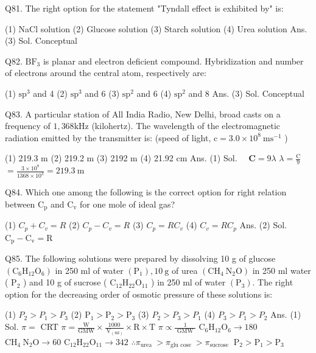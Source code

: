 \begin{enumerate}
Q81. The right option for the statement "Tyndall effect is exhibited by" is:

(1) NaCl solution
(2) Glucose solution
(3) Starch solution
(4) Urea solution
Ans. (3)
Sol. Conceptual

Q82. $\mathrm{BF}_{3}$ is planar and electron deficient compound. Hybridization and number of electrons around the central atom, respectively are:

(1) $\mathrm{sp}^{3}$ and 4
(2) $\mathrm{sp}^{3}$ and 6
(3) $\mathrm{sp}^{2}$ and 6
(4) $\mathrm{sp}^{2}$ and 8
Ans. (3)
Sol. Conceptual

Q83. A particular station of All India Radio, New Delhi, broad casts on a frequency of $1,368 \mathrm{kHz}$ (kilohertz). The wavelength of the electromagnetic radiation emitted by the transmitter is:
(speed of light, $\mathrm{c}=3.0 \times 10^{8} \mathrm{~ms}^{-1}$ )

(1) 219.3 m
(2) 219.2 m
(3) 2192 m
(4) 21.92 cm
Ans. (1)
Sol. $\quad \mathbf{C}=9 \lambda$
$\lambda=\frac{\mathrm{C}}{9}$
$=\frac{3 \times 10^{8}}{1368 \times 10^{3}}=219.3 \mathrm{~m}$

Q84. Which one among the following is the correct option for right relation between $\mathrm{C}_{\mathrm{p}}$ and $\mathrm{C}_{\mathrm{v}}$ for one mole of ideal gas?

(1) $C_{p}+C_{v}=R$
(2) $C_{p}-C_{v}=R$
(3) $C_{p}=R C_{v}$
(4) $C_{v}=R C_{p}$
Ans. (2)
Sol. $\mathrm{C}_{\mathrm{p}}-\mathrm{C}_{\mathrm{v}}=\mathrm{R}$

Q85. The following solutions were prepared by dissolving 10 g of glucose $\left(\mathrm{C}_{6} \mathrm{H}_{12} \mathrm{O}_{6}\right)$ in 250 ml of water $\left(\mathrm{P}_{1}\right), 10 \mathrm{~g}$ of urea $\left(\mathrm{CH}_{4} \mathrm{~N}_{2} \mathrm{O}\right)$ in 250 ml water ( $\mathrm{P}_{2}$ ) and 10 g of sucrose ( $\mathrm{C}_{12} \mathrm{H}_{22} \mathrm{O}_{11}$ ) in 250 ml of water $\left(\mathrm{P}_{3}\right)$. The right option for the decreasing order of osmotic pressure of these solutions is:

(1) $P_{2}>P_{1}>P_{3}$
(2) $\mathrm{P}_{1}>\mathrm{P}_{2}>\mathrm{P}_{3}$
(3) $P_{2}>P_{3}>P_{1}$
(4) $P_{3}>P_{1}>P_{2}$
Ans. (1) 
Sol. $\pi=$ CRT
$\pi=\frac{\mathrm{W}}{\mathrm{GMW}} \times \frac{1000}{\mathrm{~V}_{(\mathrm{ml})}} \times \mathrm{R} \times \mathrm{T}$
$\pi \propto \frac{1}{\text { GMW }}$
$\mathrm{C}_{6} \mathrm{H}_{12} \mathrm{O}_{6} \rightarrow 180$
$\mathrm{CH}_{4} \mathrm{~N}_{2} \mathrm{O} \rightarrow 60$
$\mathrm{C}_{12} \mathrm{H}_{22} \mathrm{O}_{11} \rightarrow 342$
$\therefore \pi_{\text {urea }}>\pi_{\text {glu cose }}>\pi_{\text {sucrose }}$
$\mathrm{P}_{2}>\mathrm{P}_{1}>\mathrm{P}_{3}$



\end{enumerate}

